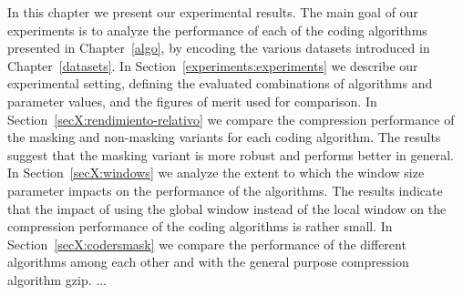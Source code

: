 
In this chapter we present our experimental results. The main goal of our experiments is to analyze the performance of each of the coding algorithms presented in Chapter~\ref{algo}, by encoding the various datasets introduced in Chapter~\ref{datasets}. In Section~\ref{experiments:experiments} we describe our experimental setting, defining the evaluated combinations of algorithms and parameter values, and the figures of merit used for comparison. In Section~\ref{secX:rendimiento-relativo} we compare the compression performance of the masking and non-masking variants for each coding algorithm. The results suggest that the masking variant is more robust and performs better in general. In Section~\ref{secX:windows} we analyze the extent to which the window size parameter impacts on the performance of the algorithms. The results indicate that the impact of using the global window instead of the local window on the compression performance of the coding algorithms is rather small. In Section~\ref{secX:codersmask} we compare the performance of the different algorithms among each other and with the general purpose compression algorithm gzip. ...

